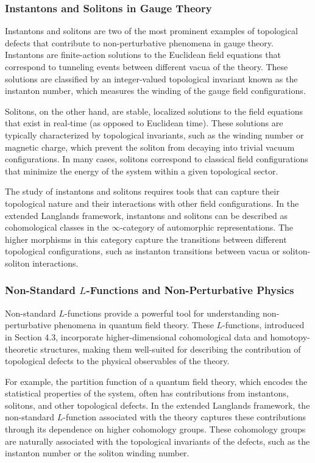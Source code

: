 \documentclass{article}
\theoremstyle{remark}
\begin{document}
\subsubsection{Instantons and Solitons in Gauge Theory}

Instantons and solitons are two of the most prominent examples of topological defects that contribute to non-perturbative phenomena in gauge theory. Instantons are finite-action solutions to the Euclidean field equations that correspond to tunneling events between different vacua of the theory. These solutions are classified by an integer-valued topological invariant known as the instanton number, which measures the winding of the gauge field configurations.

Solitons, on the other hand, are stable, localized solutions to the field equations that exist in real-time (as opposed to Euclidean time). These solutions are typically characterized by topological invariants, such as the winding number or magnetic charge, which prevent the soliton from decaying into trivial vacuum configurations. In many cases, solitons correspond to classical field configurations that minimize the energy of the system within a given topological sector.

The study of instantons and solitons requires tools that can capture their topological nature and their interactions with other field configurations. In the extended Langlands framework, instantons and solitons can be described as cohomological classes in the $\infty$-category of automorphic representations. The higher morphisms in this category capture the transitions between different topological configurations, such as instanton transitions between vacua or soliton-soliton interactions.

\subsubsection{Non-Standard $L$-Functions and Non-Perturbative Physics}

Non-standard $L$-functions provide a powerful tool for understanding non-perturbative phenomena in quantum field theory. These $L$-functions, introduced in Section 4.3, incorporate higher-dimensional cohomological data and homotopy-theoretic structures, making them well-suited for describing the contribution of topological defects to the physical observables of the theory.

For example, the partition function of a quantum field theory, which encodes the statistical properties of the system, often has contributions from instantons, solitons, and other topological defects. In the extended Langlands framework, the non-standard $L$-function associated with the theory captures these contributions through its dependence on higher cohomology groups. These cohomology groups are naturally associated with the topological invariants of the defects, such as the instanton number or the soliton winding number.
\end{document}
